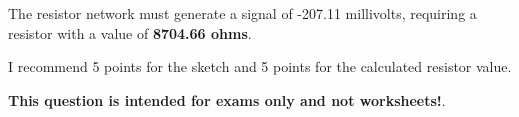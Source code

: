The resistor network must generate a signal of -207.11 millivolts, requiring a resistor with a value of {\bf 8704.66 ohms}.

\vskip 10pt

I recommend 5 points for the sketch and 5 points for the calculated resistor value.







{\bf This question is intended for exams only and not worksheets!}.


